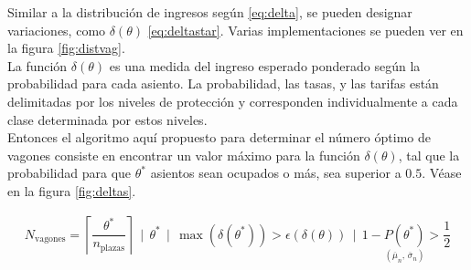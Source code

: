 \documentclass[12pt]{article}
\begin{document}
Similar a la distribución de ingresos según \eqref{eq:delta}, se pueden designar variaciones, como $\delta(\theta)$ \eqref{eq:deltastar}. Varias implementaciones se pueden ver en la figura \nolinebreak \ref{fig:distvag}.\\

La función $\delta(\theta)$ es una medida del ingreso esperado ponderado según la probabilidad para cada asiento. La probabilidad, las tasas, y las tarifas están delimitadas por los niveles de protección y corresponden individualmente a cada clase determinada por estos niveles.\\

Entonces el algoritmo aquí propuesto para determinar el número óptimo de vagones consiste en encontrar un valor máximo para la función $\delta(\theta)$, tal que la probabilidad para que $\theta^*$ asientos sean ocupados o más, sea superior a $0.5$. Véase en la figura \ref{fig:deltas}.


\begin{align}
N_{\text{vagones}} = \left\lceil\dfrac{\theta^*}{n_{\text{plazas}}}\right\rceil \, \mid \, \theta^* \, \mid \, \max\left(\delta(\theta^*)\right) > \epsilon\left(\delta(\theta)\right) \,\mid \, 1 - \underset{(\overline{\mu}_n , \, \overline{\sigma}_n)}{P(\theta^*)} > \dfrac{1}{2}
\end{align}



\printbibliography %
\end{document}
